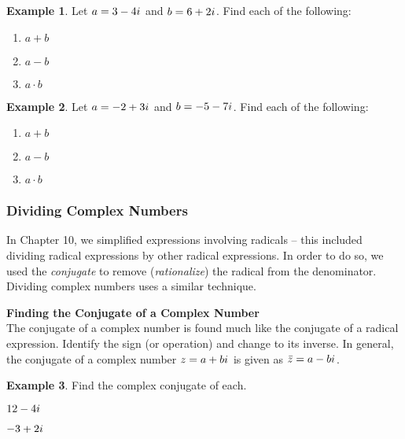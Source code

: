 \documentclass[addpoints,12pt]{exam}
\theoremstyle{definition}
\newtheorem{example}{Example}[subsection]
\newcommand{\iu}{{i\mkern1mu}}
\begin{document}
\newpage

\begin{example}
Let $a = 3-4\iu$ and $b = 6+2\iu$. Find each of the following:
\begin{enumerate}
\item $a + b$
\vspace{1in}
\item $a - b$
\vspace{1in}
\item $a\cdot b$
\vspace{1.25in}
\end{enumerate}
\end{example}

\begin{example}
Let $a = -2+3\iu$ and $b = -5-7\iu$. Find each of the following:
\begin{enumerate}
\item $a + b$
\vspace{1in}
\item $a - b$
\vspace{1in}
\item $a\cdot b$
\end{enumerate}
\end{example}
\newpage

\subsubsection*{Dividing Complex Numbers}

In Chapter 10, we simplified expressions involving radicals -- this included dividing radical expressions by other radical expressions. In order to do so, we used the \emph{conjugate} to remove (\emph{rationalize}) the radical from the denominator. Dividing complex numbers uses a similar technique. 

\vspace{.25in}

\begin{mdframed}
\textbf{Finding the Conjugate of a Complex Number}\mbox{}\\
The conjugate of a complex number is found much like the conjugate of a radical expression. Identify the sign (or operation) and change to its inverse. In general, the conjugate of a complex number $z = a+b\iu$ is given as $\bar{z} = a - b\iu$.
\end{mdframed}

\begin{example}
Find the complex conjugate of each.
\begin{enumerate}
\begin{minipage}{.5\textwidth}
\item $12 - 4\iu$
\end{minipage}%
\begin{minipage}{.5\textwidth}
\item $-3 + 2\iu$
\end{minipage}%
\end{enumerate}
\vspace{1in}
\end{example}
\end{document}
